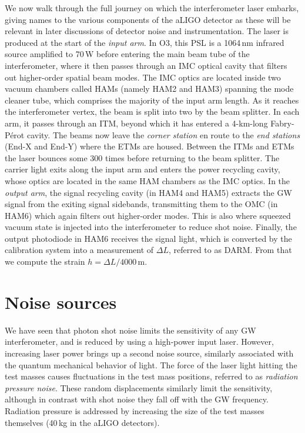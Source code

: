 We now walk through the full journey on which the interferometer laser embarks, giving names to the various components of the aLIGO detector as these will be relevant in later discussions of detector noise and instrumentation.
The laser is produced at the start of the \textit{input arm}.
In O3, this \ac{PSL} is a 1064\,nm infrared source amplified to 70\,W before entering the main beam tube of the interferometer, where it then passes through an \ac{IMC} optical cavity that filters out higher-order spatial beam modes.
The \ac{IMC} optics are located inside two vacuum chambers called \acp{HAM} (namely HAM2 and HAM3) spanning the mode cleaner tube, which comprises the majority of the input arm length.
As it reaches the interferometer vertex, the beam is split into two by the beam splitter.
In each arm, it passes through an \ac{ITM}, beyond which it has entered a 4-km-long Fabry-P\'erot cavity.
The beams now leave the \textit{corner station} en route to the \textit{end stations} (End-X and End-Y) where the \acp{ETM} are housed.
Between the \acp{ITM} and \acp{ETM} the laser bounces some 300 times before returning to the beam splitter.
The carrier light exits along the input arm and enters the power recycling cavity, whose optics are located in the same \ac{HAM} chambers as the \ac{IMC} optics.
In the \textit{output arm}, the signal recycling cavity (in HAM4 and HAM5) extracts the GW signal from the exiting signal sidebands, transmitting them to the \ac{OMC} (in HAM6) which again filters out higher-order modes.
This is also where squeezed vacuum state is injected into the interferometer to reduce shot noise.
Finally, the output photodiode in HAM6 receives the signal light, which is converted by the calibration system into a measurement of $\Delta L$, referred to as \ac{DARM}.
From that we compute the strain $h = \Delta L / 4000$\,m.


\section{Noise sources}\label{sec:noise-sources}

We have seen that photon shot noise limits the sensitivity of any GW interferometer, and is reduced by using a high-power input laser.
However, increasing laser power brings up a second noise source, similarly associated with the quantum mechanical behavior of light.
The force of the laser light hitting the test masses causes fluctuations in the test mass positions, referred to as \textit{radiation pressure noise}.
These random displacements similarly limit the sensitivity, although in contrast with shot noise they fall off with the GW frequency.
Radiation pressure is addressed by increasing the size of the test masses themselves (40\,kg in the aLIGO detectors).

